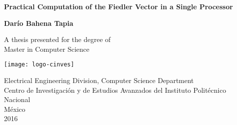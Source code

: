 \begin{titlepage}
  \begin{center}
    \vspace*{1cm}

    {\Large \textbf{Practical Computation of the Fiedler Vector in a Single Processor}}

    \vspace{1.5cm}

    \textbf{Darío Bahena Tapia}

    \vfill

    A thesis presented for the degree of\\
    Master in Computer Science

    \vspace{0.8cm}

    \texttt{[image: logo-cinves]}

    \vspace{0.8cm}
    {
      \footnotesize
      Electrical Engineering Division, Computer Science Department\\
      Centro de Investigación y de Estudios Avanzados del Instituto Politécnico Nacional\\
      México\\
      2016
    }

  \end{center}
\end{titlepage}
